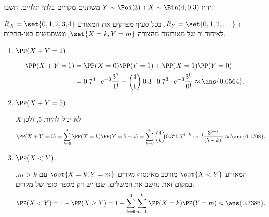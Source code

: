 יהיו $X\sim\Bin(4,0.3)$ ו-$Y\sim\Poi(3)$ משתנים מקריים בלתי תלויים. חשבו:
\begin{solbox}
\unverified
$R_X=\set{0,1,2,3,4}$ ו-$R_Y=\set{0,1,2,\dots}$. בכל סעיף מפרקים את המאורע לאיחוד זר של מאורעות מהצורה $\set{X=k,Y=m}$, ומשתמשים באי-התלות.
\end{solbox}
\begin{enumerate}
\item $\PP(X+Y=1)$;
\begin{solbox}
\unverified
\[
\begin{split}
\PP(X+Y=1)&=\PP(X=0)\PP(Y=1)+\PP(X=1)\PP(Y=0)\\
&=0.7^4\cdot e^{-3}\frac{3^1}{1!}+\binom41\,0.3\cdot0.7^3\cdot e^{-3}\frac{3^0}{0!}\approx\ans{0.0564}.
\end{split}
\]
\end{solbox}
\item $\PP(X+Y=5)$;
\begin{solbox}
\unverified
$X$ לא יכול להיות 5, ולכן
\[
\PP(X+Y=5)=\sum_{k=0}^4\PP(X=k)\PP(Y=5-k)=\sum_{k=0}^4\binom4k0.3^k0.7^{4-k}\cdot e^{-3}\frac{3^{5-k}}{(5-k)!}\approx\ans{0.1708}.
\]
\end{solbox}
\item $\PP(X<Y)$.
\begin{solbox}
\unverified
המאורע $\set{X<Y}$ מורכב מאינסוף מקרים $\set{X=k,Y=m}$ עם $m>k$. במקום זאת נחשב את המשלים, שבו יש רק מספר סופי של מקרים:
\[
\PP(X<Y)=1-\PP(X\ge Y)=1-\sum_{k=0}^4\sum_{m=0}^k\PP(X=k)\PP(Y=m)\approx\ans{0.7386}.
\]
\end{solbox}
\end{enumerate}
